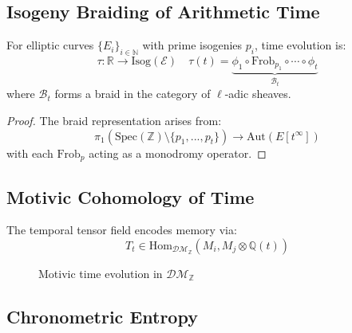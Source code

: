 \documentclass[12pt]{article}
\begin{document}
\subsection{Isogeny Braiding of Arithmetic Time}

\begin{theorem}
For elliptic curves $\{E_i\}_{i\in\mathbb{N}}$ with prime isogenies $p_i$, time evolution is:
\begin{equation}
    \tau: \mathbb{R} \to \text{Isog}(\mathcal{E}) \quad \tau(t) = \underbrace{\phi_1 \circ \text{Frob}_{p_1} \circ \cdots \circ \phi_t}_{\mathcal{B}_t}
\end{equation}
where $\mathcal{B}_t$ forms a braid in the category of $\ell$-adic sheaves.
\end{theorem}

\begin{proof}
The braid representation arises from:
\begin{equation}
    \pi_1(\text{Spec}(\mathbb{Z})\setminus\{p_1,...,p_t\}) \to \text{Aut}(E[t^\infty])
\end{equation}
with each $\text{Frob}_p$ acting as a monodromy operator.
\end{proof}

\subsection{Motivic Cohomology of Time}

The temporal tensor field encodes memory via:
\begin{equation}
    T_t \in \text{Hom}_{\mathcal{DM}_{\mathbb{Z}}}(M_i, M_j \otimes \mathbb{Q}(t))
\end{equation}

\begin{figure}[h]
    \centering
    \caption{Motivic time evolution in $\mathcal{DM}_{\mathbb{Z}}$}
\end{figure}

\subsection{Chronometric Entropy}
\end{document}
